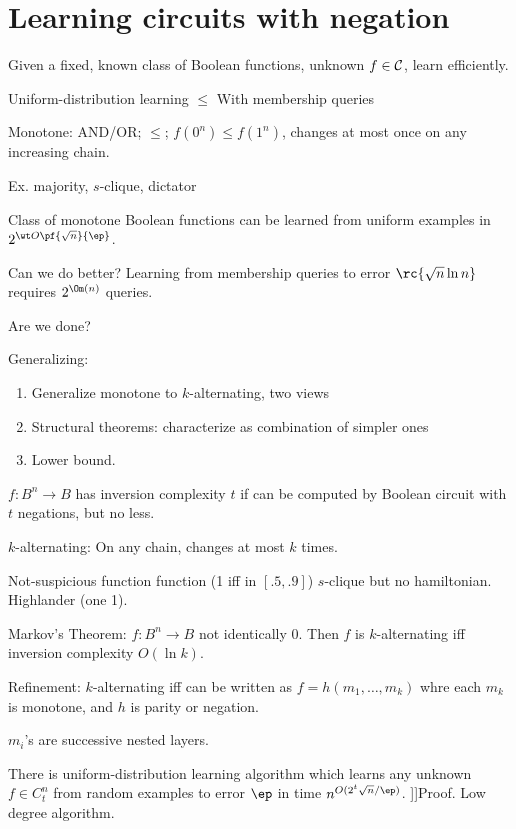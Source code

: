 
\section{Learning circuits with negation}

Given a fixed, known class of Boolean functions, unknown $f\in \cal C$, learn efficiently.

Uniform-distribution learning $\le$ With membership queries

Monotone: AND/OR; $\le$; $f(0^n)\le f(1^n)$, changes at most once on any increasing chain.

Ex. majority, $s$-clique, dictator

Class of monotone Boolean functions can be learned from uniform examples in $2^{\wt O\pf{\sqrt n}{\ep}}$. 

Can we do better? Learning from membership queries to error $\rc{\sqrt n\ln n}$ requires $2^{\Om(n)}$ queries.

Are we done?

Generalizing:
\begin{enumerate}
\item
Generalize monotone to $k$-alternating, two views
\item
Structural theorems: characterize as combination of simpler ones
\item
Lower bound.
\end{enumerate}

\begin{df}
$f:B^n\to B$ has inversion complexity $t$ if can be computed by Boolean circuit with $t$ negations, but no less.

$k$-alternating: On any chain, changes at most $k$ times.
\end{df}
Not-suspicious function function (1 iff in $[.5,.9]$)
$s$-clique but no hamiltonian.
Highlander (one 1).

Markov's Theorem: $f:B^n\to B$ not identically 0. Then $f$ is $k$-alternating iff inversion complexity $O(\ln k)$. 

Refinement: $k$-alternating iff can be written as $f=h(m_1,\ldots, m_k)$ whre each $m_k$ is monotone, and $h$ is parity or negation.

$m_i$'s are successive nested layers.

There is uniform-distribution learning algorithm which learns any unknown $f\in C_t^n$ from random examples to error $\ep$ in time $n^{O(2^t\sqrt n/\ep)}$. ]]Proof. Low degree algorithm.

